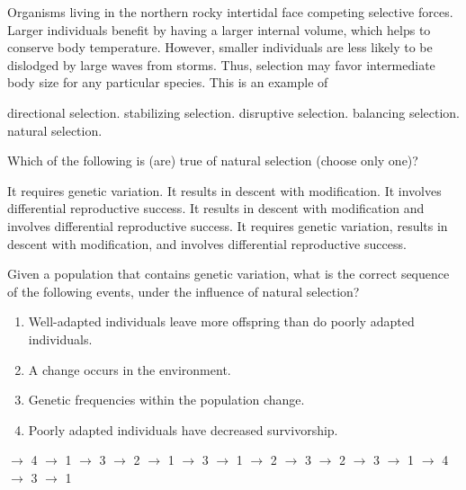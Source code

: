 \question
Organisms living in the northern rocky intertidal face competing selective forces. Larger individuals benefit by having a larger internal volume, which helps to conserve body temperature. However, smaller individuals are less likely to be dislodged by large waves from storms. Thus, selection may favor intermediate body size for any particular species. This is an example of

\begin{choices}
\choice directional selection. %
\correctchoice stabilizing selection. %
\choice disruptive selection. %
\choice balancing selection. %
\choice natural selection. %
\end{choices}

\question
Which of the following is (are) true of natural selection (choose only one)?

\begin{choices}
\choice It requires genetic variation. %
\choice It results in descent with modification. %
\choice It involves differential reproductive success. %
\choice It results in descent with modification and involves differential reproductive success. %
\correctchoice It requires genetic variation, results in descent with modification, and involves differential reproductive success. %
\end{choices}

\question
Given a population that contains genetic variation, what is the correct sequence of the following events, under the influence of natural selection?
\begin{enumerate}
	\item Well-adapted individuals leave more offspring than do poorly adapted individuals.
	\item A change occurs in the environment.
	\item Genetic frequencies within the population change.
	\item Poorly adapted individuals have decreased survivorship.
\end{enumerate}

\begin{choices}
 $\rightarrow$ 4 $\rightarrow$ 1 $\rightarrow$ 3 %
 $\rightarrow$ 2 $\rightarrow$ 1 $\rightarrow$ 3 %
 $\rightarrow$ 1 $\rightarrow$ 2 $\rightarrow$ 3 %
 $\rightarrow$ 2 $\rightarrow$ 3 $\rightarrow$ 1 %
 $\rightarrow$ 4 $\rightarrow$ 3 $\rightarrow$ 1 %
\end{choices}

